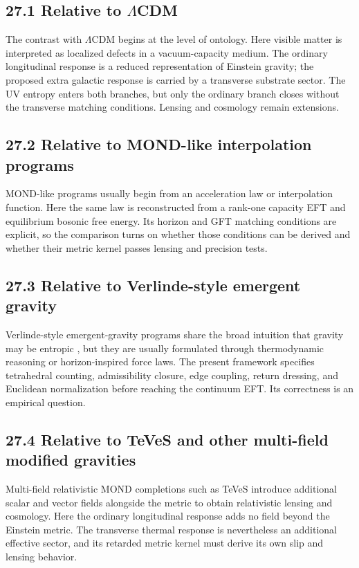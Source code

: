 \documentclass[11pt]{article}
\begin{document}
\subsection{27.1 Relative to \texorpdfstring{$\Lambda$}{Lambda}CDM}

The contrast with $\Lambda$CDM begins at the level of ontology. Here visible matter is interpreted as localized defects in a vacuum-capacity medium. The ordinary longitudinal response is a reduced representation of Einstein gravity; the proposed extra galactic response is carried by a transverse substrate sector. The UV entropy enters both branches, but only the ordinary branch closes without the transverse matching conditions. Lensing and cosmology remain extensions.

\subsection{27.2 Relative to MOND-like interpolation programs}

MOND-like programs \citep{Milgrom1983,SandersMcGaugh2002,FamaeyMcGaugh2012} usually begin from an acceleration law or interpolation function. Here the same law is reconstructed from a rank-one capacity EFT and equilibrium bosonic free energy. Its horizon and GFT matching conditions are explicit, so the comparison turns on whether those conditions can be derived and whether their metric kernel passes lensing and precision tests.

\subsection{27.3 Relative to Verlinde-style emergent gravity}

Verlinde-style emergent-gravity programs share the broad intuition that gravity may be entropic \citep{Jacobson1995,Padmanabhan2010,Verlinde2011,Verlinde2017}, but they are usually formulated through thermodynamic reasoning or horizon-inspired force laws. The present framework specifies tetrahedral counting, admissibility closure, edge coupling, return dressing, and Euclidean normalization before reaching the continuum EFT. Its correctness is an empirical question.

\subsection{27.4 Relative to TeVeS and other multi-field modified gravities}

Multi-field relativistic MOND completions such as TeVeS \citep{Bekenstein2004} introduce additional scalar and vector fields alongside the metric to obtain relativistic lensing and cosmology. Here the ordinary longitudinal response adds no field beyond the Einstein metric. The transverse thermal response is nevertheless an additional effective sector, and its retarded metric kernel must derive its own slip and lensing behavior.
\end{document}
